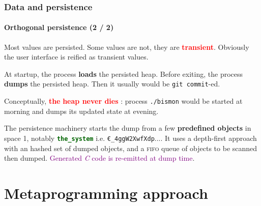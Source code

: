 \documentclass[xcolor=svgnames,final,smaller,a4]{beamer}
\begin{document}
\begin{frame}
    \frametitle{Data and persistence}
    \framesubtitle{Orthogonal persistence (2 / 2)}


Most values are persisted. Some values are not, they are
\textcolor{red}{\textbf{transient}}. Obviously the user interface is
reified as transient values.

At startup, the {\Bismon} process \textbf{loads} the persisted heap.
Before exiting, the {\Bismon} process \textbf{dumps} the persisted
heap. Then it usually would be \texttt{git commit}-ed.

Conceptually, \textcolor{red}{\textbf{the}} {\Bismon}  \textcolor{red}{\textbf{heap never dies}} : process {\texttt{./bismon}} would be started at morning and dumps its updated state at evening.

The persistence machinery starts the dump from a few \textbf{predefined
  objects} in space 1, notably
{\textcolor{DarkGreen}{\texttt{\textbf{the\_system}}}}
i.e. \texttt{€\_4ggW2XwfXdp}.... It uses a depth-first approach with
an hashed set of dumped objects, and a \textsc{fifo} queue of objects
to be scanned then dumped. \textcolor{purple}{Generated \textit{C} code is re-emitted at dump time}.

\end{frame}
    
\section{Metaprogramming approach}
\end{document}
